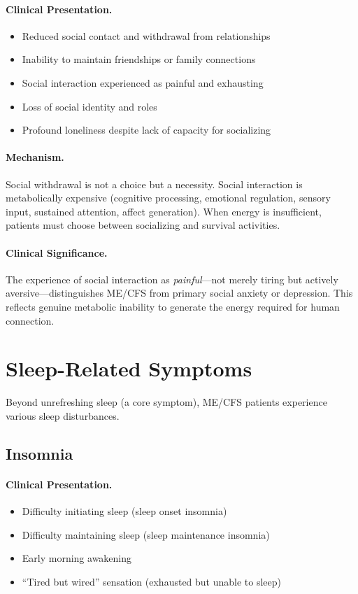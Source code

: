\paragraph{Clinical Presentation.}
\begin{itemize}
    \item Reduced social contact and withdrawal from relationships
    \item Inability to maintain friendships or family connections
    \item Social interaction experienced as painful and exhausting
    \item Loss of social identity and roles
    \item Profound loneliness despite lack of capacity for socializing
\end{itemize}

\paragraph{Mechanism.}
Social withdrawal is not a choice but a necessity. Social interaction is metabolically expensive (cognitive processing, emotional regulation, sensory input, sustained attention, affect generation). When energy is insufficient, patients must choose between socializing and survival activities.

\paragraph{Clinical Significance.}
The experience of social interaction as \emph{painful}---not merely tiring but actively aversive---distinguishes ME/CFS from primary social anxiety or depression. This reflects genuine metabolic inability to generate the energy required for human connection.

\section{Sleep-Related Symptoms}
\label{sec:sleep-related}

Beyond unrefreshing sleep (a core symptom), ME/CFS patients experience various sleep disturbances.

\subsection{Insomnia}
\label{subsec:insomnia}

\paragraph{Clinical Presentation.}
\begin{itemize}
    \item Difficulty initiating sleep (sleep onset insomnia)
    \item Difficulty maintaining sleep (sleep maintenance insomnia)
    \item Early morning awakening
    \item ``Tired but wired'' sensation (exhausted but unable to sleep)
\end{itemize}

